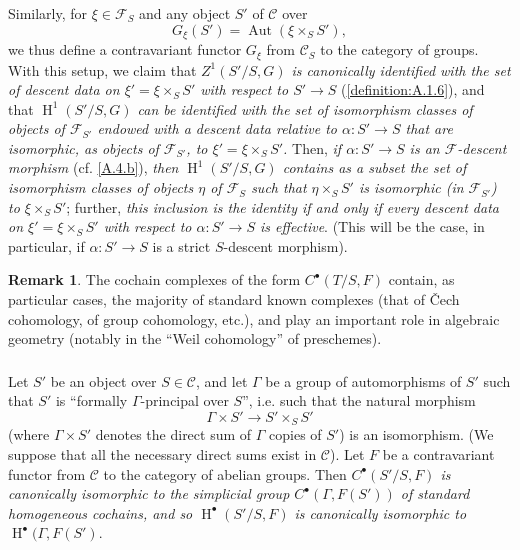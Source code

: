 \documentclass{article}
\theoremstyle{plain}
\theoremstyle{definition}
\newenvironment{example}[1]
  {\renewcommand\theinnercustomexample{#1}\innercustomexample}
  {\endinnercustomexample}
\newtheorem*{remark}{Remark}
\newcommand{\sh}[1]{{\mathscr{#1}}}
\newcommand{\cat}[1]{{\mathcal{#1}}}
\DeclareMathOperator{\Aut}{Aut}
\DeclareMathOperator{\HH}{H}
\newcommand{\oldpage}[1]{\marginpar{\footnotesize$\Big\vert$ \textit{p.~#1}}}
\begin{document}
Similarly, for $\xi\in\sh{F}_S$ and any object $S'$ of $\cat{C}$ over
\[
  G_\xi(S') = \Aut(\xi\times_S S'),
\]
we thus define a contravariant functor $G_\xi$ from $\cat{C}_S$ to the category of
\oldpage{190-14}
groups.
With this setup, we claim that \emph{$Z^1(S'/S,G)$ is canonically identified with the set of descent data on $\xi'=\xi\times_S S'$ with respect to $S'\to S$} (\cref{definition:A.1.6}), and that \emph{$\HH^1(S'/S,G)$ can be identified with the set of isomorphism classes of objects of $\sh{F}_{S'}$ endowed with a descent data relative to $\alpha\colon S'\to S$ that are isomorphic, as objects of $\sh{F}_{S'}$, to $\xi'=\xi\times_S S'$.}
Then, \emph{if $\alpha\colon S'\to S$ is an $\sh{F}$-descent morphism} (cf. \cref{A.4.b}), \emph{then $\HH^1(S'/S,G)$ contains as a subset the set of isomorphism classes of objects $\eta$ of $\sh{F}_S$ such that $\eta\times_S S'$ is isomorphic (in $\sh{F}_{S'}$) to $\xi\times_S S'$};
further, \emph{this inclusion is the identity if and only if every descent data on $\xi'=\xi\times_S S'$ with respect to $\alpha\colon S'\to S$ is effective}.
(This will be the case, in particular, if $\alpha\colon S'\to S$ is a strict $S$-descent morphism).

\begin{remark}
  The cochain complexes of the form $C^\bullet(T/S,F)$ contain, as particular cases, the majority of standard known complexes (that of \v{C}ech cohomology, of group cohomology, etc.), and play an important role in algebraic geometry (notably in the ``Weil cohomology'' of preschemes).
\end{remark}


\subsubsection{}
\label{A.4.d}

\begin{example}{1}
  Let $S'$ be an object over $S\in\cat{C}$, and let $\Gamma$ be a group of automorphisms of $S'$ such that $S'$ is ``formally $\Gamma$-principal over $S$'', i.e. such that the natural morphism
  \[
    \Gamma\times S' \to S'\times_S S'
  \]
  (where $\Gamma\times S'$ denotes the direct sum of $\Gamma$ copies of $S'$) is an isomorphism.
  (We suppose that all the necessary direct sums exist in $\cat{C}$).
  Let $F$ be a contravariant functor from $\cat{C}$ to the category of abelian groups.
  Then \emph{$C^\bullet(S'/S,F)$ is canonically isomorphic to the simplicial group $C^\bullet(\Gamma,F(S'))$ of standard homogeneous cochains, and so $\HH^\bullet(S'/S,F)$ is canonically isomorphic to $\HH^\bullet(\Gamma,F(S')$}.
\end{example}
\end{document}
